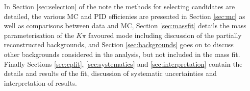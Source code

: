 In Section \ref{sec:selection} of the note the methods for selecting \decay{\Bpm}{\D\Kstarpm} candidates are detailed, the various MC and PID efficienies are presented in Section \ref{sec:mc} as well as comparisons between data and MC, Section \ref{sec:massfit} details the mass parameterisation of the $K\pi$ favoured mode including discussion of the partially reconstructed backgrounds, and Section \ref{sec:backgrounds} goes on to discuss other backgrounds considered in the analysis, but not included in the mass fit. Finally Sections \ref{sec:cpfit}, \ref{sec:systematics} and \ref{sec:interpretation} contain the details and results of the \CP fit, discussion of systematic uncertainties and interpretation of results.
